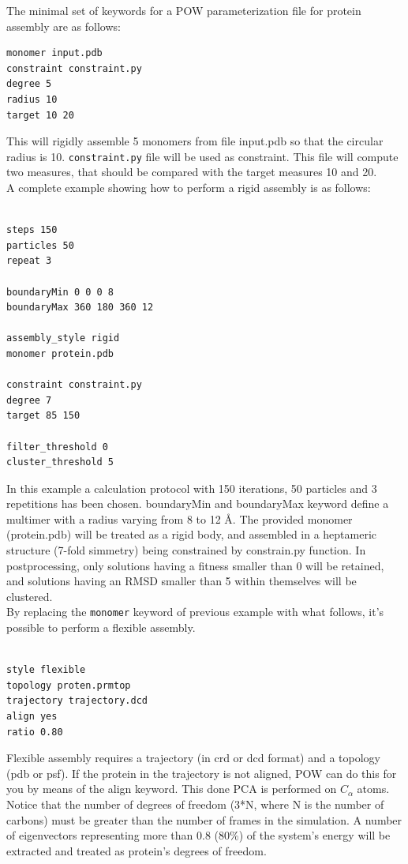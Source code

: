 \documentclass[a4paper, 12pt]{article}
\begin{document}
The minimal set of keywords for a POW parameterization file for protein assembly are as follows:

\begin{verbatim}
monomer input.pdb
constraint constraint.py
degree 5
radius 10
target 10 20
\end{verbatim}

This will rigidly assemble 5 monomers from file input.pdb so that the circular radius is 10. \texttt{constraint.py} file will be used as constraint. This file will compute two measures, that should be compared with the target measures 10 and 20.\\

A complete example showing how to perform a rigid assembly is as follows:

\begin{verbatim}

steps 150
particles 50
repeat 3

boundaryMin 0 0 0 8
boundaryMax 360 180 360 12

assembly_style rigid
monomer protein.pdb

constraint constraint.py
degree 7
target 85 150

filter_threshold 0
cluster_threshold 5

\end{verbatim}

In this example a calculation protocol with 150 iterations, 50 particles and 3 repetitions has been chosen. boundaryMin and boundaryMax keyword define a multimer with a radius varying from 8 to 12 \AA. The provided monomer (protein.pdb) will be treated as a rigid body, and assembled in a heptameric structure (7-fold simmetry) being constrained by constrain.py function. In postprocessing, only solutions having a fitness smaller than 0 will be retained, and solutions having an RMSD smaller than 5 within themselves will be clustered.\\

By replacing the \texttt{monomer} keyword of previous example with what follows, it's possible to perform a flexible assembly.

\begin{verbatim}

style flexible
topology proten.prmtop
trajectory trajectory.dcd
align yes
ratio 0.80

\end{verbatim}

Flexible assembly requires a trajectory (in crd or dcd format) and a topology (pdb or psf). If the protein in the trajectory is not aligned, POW can do this for you by means of the align keyword. This done PCA is performed on $C_\alpha$ atoms. Notice that the number of degrees of freedom (3*N, where N is the number of carbons) must be greater than the number of frames in the simulation. A number of eigenvectors representing more than 0.8 (80\%) of the system's energy will be extracted and treated as protein's degrees of freedom.\\
\end{document}
